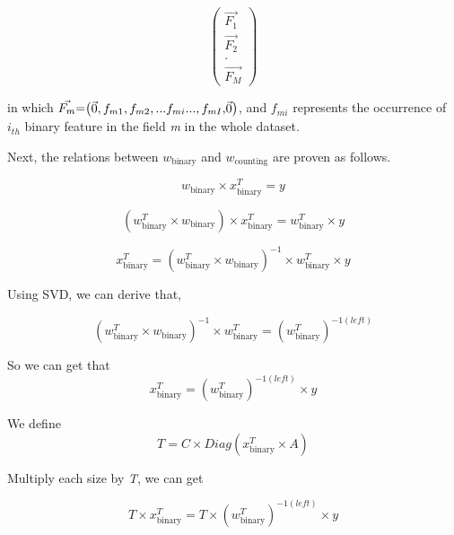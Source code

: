 \documentclass{article}
\begin{document}
$$
\begin{pmatrix} 
\vec{F_1} \\
\vec{F_2} \\
.\\
\vec{F_M}

\end{pmatrix}
$$

\noindent in which \($$\vec{F_m}$$ = $$\begin{pmatrix} 
$$\vec{0 }$$ , f_{m1}, f_{m2}, ...f_{mi}... , f_{mI} ,$$\vec{0 }$$ 
\end{pmatrix}$$\), and \(f_{mi}\) represents the occurrence of \(i_{th}\) binary feature in the field \textsl{m} in the whole dataset.\vspace{5mm}

\noindent Next, the relations between \(w_{\text{binary}}\) and \(w_{\text{counting}}\) are proven as follows. 

\begin{equation}
w_{\text{binary}} \times x_{\text{binary}}^T = y 
\end{equation}

\begin{equation}
(w_{\text{binary}}^T \times w_{\text{binary}}) \times x_{\text{binary}}^T = w_{\text{binary}}^T \times y 
\end{equation}

\begin{equation}
x_{\text{binary}}^T = (w_{\text{binary}}^T \times w_{\text{binary}})^{-1} \times w_{\text{binary}}^T \times y 
\end{equation}

Using SVD, we can derive that,

\begin{equation}
(w_{\text{binary}}^T \times w_{\text{binary}})^{-1} \times w_{\text{binary}}^T = (w_{\text{binary}}^T)^{-1(left)}  
\end{equation}

So we can get that 
\begin{equation}
x_{\text{binary}}^T =  (w_{\text{binary}}^T)^{-1(left)} \times y 
\end{equation}

We define
\begin{equation}
T = C \times Diag(x_{\text{binary}}^T \times A)
\end{equation}


Multiply each size by \textsl{T}, we can get
 
\begin{equation}
T \times x_{\text{binary}}^T =  T \times (w_{\text{binary}}^T)^{-1(left)} \times y 
\end{equation}
\end{document}
